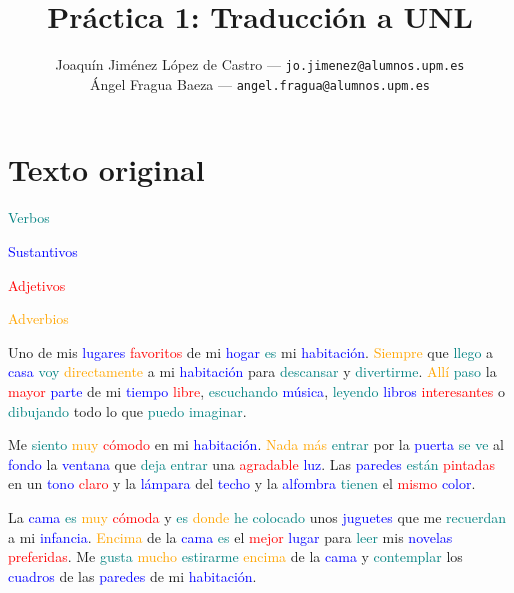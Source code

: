 \documentclass{article}
\title{Práctica 1: Traducción a UNL} %
\author{
        \normalsize Joaquín Jiménez López de Castro --- \small\texttt{jo.jimenez@alumnos.upm.es}\\
        \normalsize Ángel Fragua Baeza --- \small\texttt{angel.fragua@alumnos.upm.es}
}
\begin{document}
\maketitle

\thispagestyle{empty}

\newpage


\section{Texto original}

\textcolor{teal}{Verbos}

\textcolor{blue}{Sustantivos}

\textcolor{red}{Adjetivos}

\textcolor{orange}{Adverbios}

Uno de mis \textcolor{blue}{lugares} \textcolor{red}{favoritos} de mi \textcolor{blue}{hogar} \textcolor{teal}{es} mi \textcolor{blue}{habitación}. \textcolor{orange}{Siempre} que \textcolor{teal}{llego} a \textcolor{blue}{casa} \textcolor{teal}{voy} \textcolor{orange}{directamente} a mi \textcolor{blue}{habitación} para \textcolor{teal}{descansar} y \textcolor{teal}{divertirme}. \textcolor{orange}{Allí} \textcolor{teal}{paso} la \textcolor{red}{mayor} \textcolor{blue}{parte} de mi \textcolor{blue}{tiempo} \textcolor{red}{libre}, \textcolor{teal}{escuchando} \textcolor{blue}{música}, \textcolor{teal}{leyendo} \textcolor{blue}{libros} \textcolor{red}{interesantes} o \textcolor{teal}{dibujando} todo lo que \textcolor{teal}{puedo imaginar}.

Me \textcolor{teal}{siento} \textcolor{orange}{muy} \textcolor{red}{cómodo} en mi \textcolor{blue}{habitación}. \textcolor{orange}{Nada más} \textcolor{teal}{entrar} por la \textcolor{blue}{puerta} \textcolor{teal}{se ve} al \textcolor{blue}{fondo} la \textcolor{blue}{ventana} que \textcolor{teal}{deja} \textcolor{teal}{entrar} una \textcolor{red}{agradable} \textcolor{blue}{luz}. Las \textcolor{blue}{paredes} \textcolor{teal}{están} \textcolor{red}{pintadas} en un \textcolor{blue}{tono} \textcolor{red}{claro} y la \textcolor{blue}{lámpara} del \textcolor{blue}{techo} y la \textcolor{blue}{alfombra} \textcolor{teal}{tienen} el \textcolor{red}{mismo} \textcolor{blue}{color}.

La \textcolor{blue}{cama} \textcolor{teal}{es} \textcolor{orange}{muy} \textcolor{red}{cómoda} y \textcolor{teal}{es} \textcolor{orange}{donde} \textcolor{teal}{he colocado} unos \textcolor{blue}{juguetes} que me \textcolor{teal}{recuerdan} a mi \textcolor{blue}{infancia}. \textcolor{orange}{Encima} de la \textcolor{blue}{cama} \textcolor{teal}{es} el \textcolor{red}{mejor} \textcolor{blue}{lugar} para \textcolor{teal}{leer} mis \textcolor{blue}{novelas} \textcolor{red}{preferidas}. Me \textcolor{teal}{gusta} \textcolor{orange}{mucho} \textcolor{teal}{estirarme} \textcolor{orange}{encima} de la \textcolor{blue}{cama} y \textcolor{teal}{contemplar} los \textcolor{blue}{cuadros} de las \textcolor{blue}{paredes} de mi \textcolor{blue}{habitación}.
\end{document}
